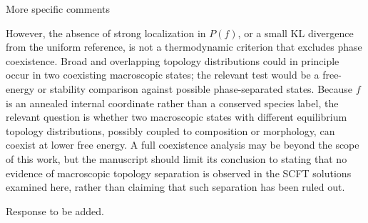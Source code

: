 \documentclass[../ResponsetoReviewers.tex]{subfiles}
\begin{document}
\begin{reviewersection}
\begin{reviewergroup}{More specific comments}
\begin{qa}
    However, the absence of strong localization in $P(f)$, or a small KL divergence from the uniform reference, is not a thermodynamic criterion that excludes phase coexistence.
    Broad and overlapping topology distributions could in principle occur in two coexisting macroscopic states; the relevant test would be a free-energy or stability comparison against possible phase-separated states.
    Because $f$ is an annealed internal coordinate rather than a conserved species label, the relevant question is whether two macroscopic states with different equilibrium topology distributions, possibly coupled to composition or morphology, can coexist at lower free energy.
    A full coexistence analysis may be beyond the scope of this work, but the manuscript should limit its conclusion to stating that no evidence of macroscopic topology separation is observed in the SCFT solutions examined here, rather than claiming that such separation has been ruled out.
\end{qa}
\begin{reply}
    Response to be added.
\end{reply}

\end{reviewergroup}

\end{reviewersection}
\end{document}
